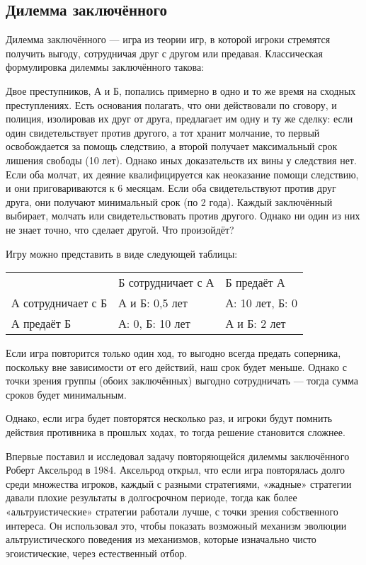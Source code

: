 \documentclass[utf8,a5paper,portrait,10pt,twoside]{eskdtext}
\begin{document}
\subsection{Дилемма заключённого}

Дилемма заключённого — игра из теории игр, в которой игроки стремятся получить
выгоду, сотрудничая друг с другом или предавая.\cite{dilemma} Классическая
формулировка дилеммы заключённого такова:

Двое преступников, А и Б, попались примерно в одно и то же время на сходных преступлениях. Есть основания полагать, что они действовали по сговору, и полиция, изолировав их друг от друга, предлагает им одну и ту же сделку: если один свидетельствует против другого, а тот хранит молчание, то первый освобождается за помощь следствию, а второй получает максимальный срок лишения свободы (10 лет). Однако иных доказательств их вины у следствия нет. Если оба молчат, их деяние квалифицируется как неоказание помощи следствию, и они приговариваются к 6 месяцам. Если оба свидетельствуют против друг друга, они получают минимальный срок (по 2 года). Каждый заключённый выбирает, молчать или свидетельствовать против другого. Однако ни один из них не знает точно, что сделает другой. Что произойдёт?

Игру можно представить в виде следующей таблицы:

\begin{tabular}{|lll|}
                   & Б сотрудничает с А & Б предаёт А \\
А сотрудничает с Б & А и Б: 0,5 лет  & А: 10 лет, Б: 0 \\
А предаёт Б        & А: 0, Б: 10 лет & А и Б: 2 лет
\end{tabular}

Если игра повторится только один ход, то выгодно всегда предать соперника,
поскольку вне зависимости от его действий, наш срок будет меньше. Однако с точки
зрения группы (обоих заключённых) выгодно сотрудничать — тогда сумма сроков
будет минимальным.

Однако, если игра будет повторятся несколько раз, и игроки будут помнить
действия противника в прошлых ходах, то тогда решение становится сложнее.

Впервые поставил и исследовал задачу повторяющейся дилеммы заключённого Роберт
Аксельрод в 1984. Аксельрод открыл, что если игра повторялась долго среди
множества игроков, каждый с разными стратегиями, «жадные» стратегии давали
плохие результаты в долгосрочном периоде, тогда как более «альтруистические»
стратегии работали лучше, с точки зрения собственного интереса. Он использовал
это, чтобы показать возможный механизм эволюции альтруистического поведения из
механизмов, которые изначально чисто эгоистические, через естественный отбор.
\end{document}
